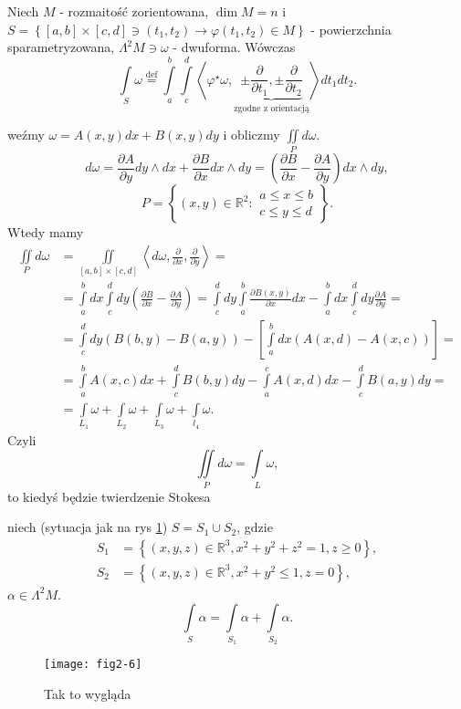 \documentclass[../main.tex]{subfiles}
\begin{document}
\begin{definicja}
    Niech $M$ - rozmaitość zorientowana, $\dim M = n$ i \\
    $S = \left\{ [a,b]\times[c,d]\ni (t_1,t_2) \to \varphi(t_1,t_2)\in M \right\}$ - powierzchnia sparametryzowana, $\Lambda^2M\ni\omega$ - dwuforma. Wówczas
    \[
        \int\limits_S \omega \overset{\text{def}}{=} \int\limits_a^b\int\limits_c^d \left<\varphi^\star\omega, \underbrace{\pm \frac{\partial }{\partial t_1} , \pm \frac{\partial }{\partial t_2}}_\text{zgodne z orientacją}\right>dt_1dt_2
    .\]
\end{definicja}
\begin{przyklad}
    weźmy $\omega = A(x,y)dx + B(x,y)dy$ i obliczmy $\iint\limits_P d\omega$.
     \[
         d\omega = \frac{\partial A}{\partial y} dy\land dx + \frac{\partial B}{\partial x} dx\land dy = \left(\frac{\partial B}{\partial x} - \frac{\partial A}{\partial y} \right)dx\land dy
    ,\]
\[
    P = \left\{ (x,y)\in \mathbb{R}^2: \begin{matrix}a\le x\le b\\ c\le y \le d \end{matrix} \right\}
.\]
Wtedy mamy
\begin{align*}
    \iint\limits_P d\omega &= \iint\limits_{[a,b]\times[c,d]} \left<d\omega, \frac{\partial }{\partial x} , \frac{\partial }{\partial y}  \right> = \\
    &= \int\limits_a^b dx \int\limits_c^d dy\left(\frac{\partial B}{\partial x} - \frac{\partial A}{\partial y} \right) = \int\limits_c^d dy\int\limits_a^b \frac{\partial B(x,y)}{\partial x} dx - \int\limits_a^bdx\int\limits_c^ddy \frac{\partial A}{\partial y} = \\
    &= \int\limits_c^d dy(B(b,y) - B(a,y)) - \left[ \int\limits_a^bdx \left( A(x,d) - A(x,c) \right)  \right] = \\
    &= \int\limits_a^bA(x,c)dx + \int\limits_c^dB(b,y)dy - \int\limits_a^cA(x,d)dx - \int\limits_c^dB(a,y)dy =\\
    &= \int\limits_{L_1}\omega + \int\limits_{L_2}\omega + \int\limits_{L_3}\omega + \int\limits_{l_4}\omega
.\end{align*}
Czyli \[
\iint\limits_Pd\omega = \int\limits_L \omega
,\]
to kiedyś będzie twierdzenie Stokesa
\end{przyklad}
\begin{przyklad}
    niech (sytuacja jak na rys \ref{fig:fig2-6}) $S = S_1\cup S_2$, gdzie
\begin{align*}
        S_1 &= \left\{ (x,y,z)\in \mathbb{R}^3, x^2 + y^2 + z^2 = 1, z\ge 0 \right\},\\
        S_2 &= \left\{ (x,y,z)\in \mathbb{R}^3, x^2+y^2 \le 1, z = 0 \right\}
,\end{align*}
$\alpha\in \Lambda^2M$.
\[
\int\limits_S \alpha = \int\limits_{S_1}\alpha + \int\limits_{S_2}\alpha
.\]
    \begin{figure}[h]
        \centering
        \texttt{[image: fig2-6]}
        \caption{Tak to wygląda}
        \label{fig:fig2-6}
    \end{figure}
\end{przyklad}
\end{document}
